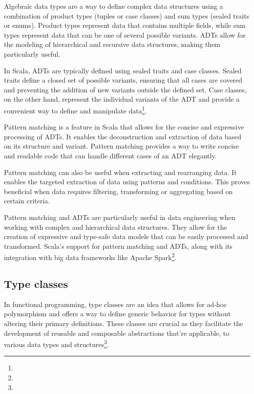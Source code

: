 Algebraic data types are a way to define complex data structures using a combination of product types (tuples or case classes) and sum types (sealed traits or enums). Product types represent data that contains multiple fields, while sum types represent data that can be one of several possible variants. ADTs allow for the modeling of hierarchical and recursive data structures, making them particularly useful\footnotemark[11].

In Scala, ADTs are typically defined using sealed traits and case classes. Sealed traits define a closed set of possible variants, ensuring that all cases are covered and preventing the addition of new variants outside the defined set. Case classes, on the other hand, represent the individual variants of the ADT and provide a convenient way to define and manipulate data\footnote[11]{}.



Pattern matching is a feature in Scala that allows for the concise and expressive processing of ADTs. It enables the deconstruction and extraction of data based on its structure and variant. Pattern matching provides a way to write concise and readable code that can handle different cases of an ADT elegantly\footnotemark[11].



Pattern matching can also be useful when extracting and rearranging data. It enables the targeted extraction of data using patterns and conditions. This proves beneficial when data requires filtering, transforming or aggregating based on certain criteria\footnotemark[11].



Pattern matching and ADTs are particularly useful in data engineering when working with complex and hierarchical data structures. They allow for the creation of expressive and type-safe data models that can be easily processed and transformed. Scala's support for pattern matching and ADTs, along with its integration with big data frameworks like Apache Spark\footnote[11]{}.



\subsection{Type classes}

In functional programming, type classes are an idea that allows for ad-hoc polymorphism and offers a way to define generic behavior for types without altering their primary definitions. These classes are crucial as they facilitate the development of reusable and composable abstractions that're applicable, to various data types and structures\footnote[2]{}.

